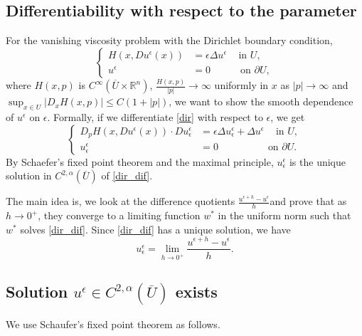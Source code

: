 \documentclass[11pt,reqno]{amsart}
\numberwithin{figure}{section}
\theoremstyle{plain}
\theoremstyle{remark}
\numberwithin{equation}{section}
\begin{document}
\begin{appendices}
\section{Differentiability with respect to the parameter}
For the vanishing viscosity problem with the Dirichlet boundary condition,
\begin{equation}
\label{dir}
\left\{
  \begin{aligned}
    H(x, Du^\epsilon(x)) &= \epsilon \Delta u^\epsilon \quad \, \text{in } U, \\
              u^\epsilon &= 0 \quad \qquad \text{on } \partial U,
  \end{aligned}
\right.
\end{equation}
where  $H(x,p)$ is $C^\infty(\overline{U}\times \mathbb{R}^n)$, $\displaystyle \frac{H(x,p)}{|p|} \to \infty$ uniformly in $x$ as $|p| \to \infty$ and $\displaystyle \sup_{x\in U}|D_xH(x,p)|\leq C(1+|p|)$, we want to show the smooth dependence of $u^\epsilon$ on $\epsilon$.
Formally, if we differentiate \eqref{dir} with respect to $\epsilon$, we get
\begin{equation}
\label{dir_dif}
\left\{
  \begin{aligned}
    D_pH(x, Du^\epsilon(x))\cdot Du^\epsilon_\epsilon &= \epsilon \Delta u^\epsilon_\epsilon +\Delta u^\epsilon \quad \, \text{in } U, \\
              u^\epsilon_\epsilon &= 0 \quad \qquad  \qquad  \text{on } \partial U.
  \end{aligned}
\right.
\end{equation}
By Schaefer's fixed point theorem and the maximal principle, $u^\epsilon_\epsilon$ is the unique solution in $C^{2,\alpha}(\overline{U})$ of \eqref{dir_dif}. 

\noindent The main idea is, we look at the difference quotients $\displaystyle \frac{u^{\epsilon+h}-u^\epsilon}{h}$and prove that as $h \to 0^+$, they converge to a limiting function $w^{\ast}$ in the uniform norm  such that $w^{\ast}$ solves \eqref{dir_dif}. Since \eqref{dir_dif} has a unique solution, we have $$u^\epsilon_\epsilon=\lim_{h \to 0^+}\frac{u^{\epsilon+h}-u^\epsilon}{h}.$$

\subsection{Solution $u^\epsilon \in C^{2,\alpha}(\overline{U})$ exists} We use Schaufer's fixed point theorem as follows.


\end{appendices}
\end{document}
